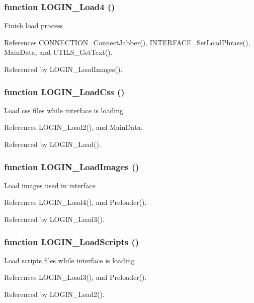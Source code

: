 \subsubsection{\setlength{\rightskip}{0pt plus 5cm}function LOGIN\_\-Load4 ()}\label{login_2load_8js_e7e0a7d2cb1d4c5f547244c150c6f5d5}


Finish load process 

References CONNECTION\_\-ConnectJabber(), INTERFACE\_\-SetLoadPhrase(), MainData, and UTILS\_\-GetText().

Referenced by LOGIN\_\-LoadImages().
\subsubsection{\setlength{\rightskip}{0pt plus 5cm}function LOGIN\_\-LoadCss ()}\label{login_2load_8js_16cb7be89b1c1af1ce320778127d1b11}


Load css files while interface is loading 

References LOGIN\_\-Load2(), and MainData.

Referenced by LOGIN\_\-Load().
\subsubsection{\setlength{\rightskip}{0pt plus 5cm}function LOGIN\_\-LoadImages ()}\label{login_2load_8js_12b76f037d9d5af6be0c544ebb182e90}


Load images used in interface 

References LOGIN\_\-Load4(), and Preloader().

Referenced by LOGIN\_\-Load3().
\subsubsection{\setlength{\rightskip}{0pt plus 5cm}function LOGIN\_\-LoadScripts ()}\label{login_2load_8js_45331d23c96e1197a44eb08ebb8d6905}


Load scripts files while interface is loading 

References LOGIN\_\-Load3(), and Preloader().

Referenced by LOGIN\_\-Load2().